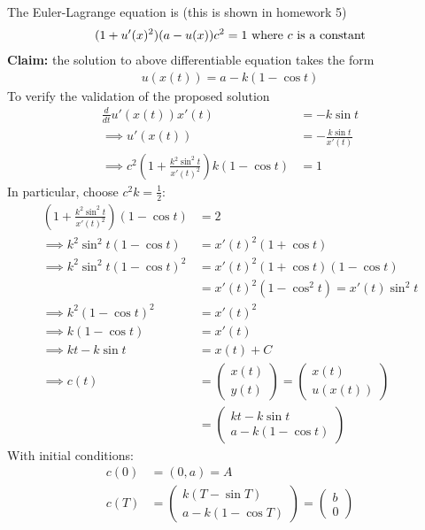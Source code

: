 \documentclass{article}
\begin{document}
\begin{example}
		The Euler-Lagrange equation is (this is shown in homework 5)
		\begin{align}
			(1 + u'(x)^2)(a - u(x))c^2 = 1\ \text{{where $c$ is a constant}}
		\end{align}
		\textbf{Claim:} the solution to above differentiable equation takes the form
		\begin{align}
			u(x(t)) = a - k(1 - \cos t)
		\end{align}
		To verify the validation of the proposed solution
		\begin{align}
			\frac{d}{dt} u'(x(t)) x'(t) &= - k \sin t \\
			\implies u'(x(t)) &= -\frac{k \sin t}{x'(t)} \\
			\implies c^2 \left(1 + \frac{k^2 \sin^2 t}{x'(t)^2} \right) k (1 - \cos t) &= 1
		\end{align}
		In particular, choose $c^2 k = \frac{1}{2}$:
		\begin{align}
			\left(1 + \frac{k^2 \sin^2 t}{x'(t)^2} \right) (1 - \cos t) &= 2 \\
			\implies k^2 \sin^2 t (1 - \cos t) &= x'(t)^2 (1 + \cos t) \\
			\implies k^2 \sin^2 t (1 - \cos t)^2 &= x'(t)^2 (1 + \cos t) (1 - \cos t) \\
			&= x'(t)^2(1 - \cos^2 t) = x'(t) \sin^2 t \\
			\implies k^2(1 - \cos t)^2 &= x'(t)^2 \\
			\implies k (1 - \cos t) &= x'(t) \\
			\implies k t - k \sin t &= x(t) + C \\
			\implies c(t) &= \begin{pmatrix}
				x(t) \\ y(t)
			\end{pmatrix} = \begin{pmatrix}
				x(t) \\ u(x(t))
			\end{pmatrix} \\
			&= \begin{pmatrix}
				kt - k\sin t \\
				a - k(1 - \cos t)
			\end{pmatrix}
		\end{align}
		With initial conditions:
		\begin{align}
			c(0) &= (0, a) = A \\
			c(T) &= \begin{pmatrix}
				k(T - \sin T) \\
				a - k(1 - \cos T)
			\end{pmatrix} = \begin{pmatrix}
				b \\ 0
			\end{pmatrix}
		\end{align}
	\end{example}
	
\end{document}
